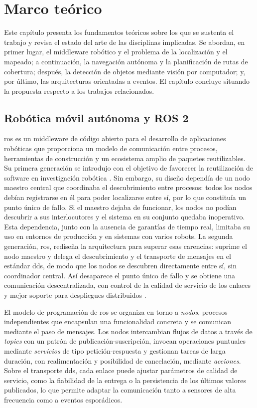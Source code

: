 \chapter{Marco teórico}
\label{cap:marco-teorico}

Este capítulo presenta los fundamentos teóricos sobre los que se sustenta el
trabajo y revisa el estado del arte de las disciplinas implicadas. Se abordan,
en primer lugar, el middleware robótico y el problema de la localización y el
mapeado; a continuación, la navegación autónoma y la planificación de rutas de
cobertura; después, la detección de objetos mediante visión por computador; y,
por último, las arquitecturas orientadas a eventos. El capítulo concluye
situando la propuesta respecto a los trabajos relacionados.

\section{Robótica móvil autónoma y ROS 2}
\label{sec:ros2}

\gls{ros} es un middleware de código abierto para el desarrollo de aplicaciones
robóticas que proporciona un modelo de comunicación entre procesos, herramientas
de construcción y un ecosistema amplio de paquetes reutilizables. Su primera
generación se introdujo con el objetivo de favorecer la reutilización de
software en investigación robótica \parencite{quigley2009ros}. Sin embargo, su
diseño dependía de un nodo maestro central que coordinaba el descubrimiento
entre procesos: todos los nodos debían registrarse en él para poder localizarse
entre sí, por lo que constituía un punto único de fallo. Si el maestro dejaba de
funcionar, los nodos no podían descubrir a sus interlocutores y el sistema en su
conjunto quedaba inoperativo. Esta dependencia, junto con la ausencia de
garantías de tiempo real, limitaba su uso en entornos de producción y en
sistemas con varios robots. La segunda generación, \gls{ros}, rediseña la
arquitectura para superar esas carencias: suprime el nodo maestro y delega el
descubrimiento y el transporte de mensajes en el estándar \gls{dds}, de modo que
los nodos se descubren directamente entre sí, sin coordinador central. Así
desaparece el punto único de fallo y se obtiene una comunicación descentralizada,
con control de la calidad de servicio de los enlaces y mejor soporte para
despliegues distribuidos \parencite{macenski2022ros2}.

El modelo de programación de \gls{ros} se organiza en torno a \textit{nodos},
procesos independientes que encapsulan una funcionalidad concreta y se comunican
mediante el paso de mensajes. Los nodos intercambian flujos de datos a través de
\textit{topics} con un patrón de publicación-suscripción, invocan operaciones
puntuales mediante \textit{servicios} de tipo petición-respuesta y gestionan
tareas de larga duración, con realimentación y posibilidad de cancelación,
mediante \textit{acciones}. Sobre el transporte \gls{dds}, cada enlace puede
ajustar parámetros de calidad de servicio, como la fiabilidad de la entrega o la
persistencia de los últimos valores publicados, lo que permite adaptar la
comunicación tanto a sensores de alta frecuencia como a eventos esporádicos.

